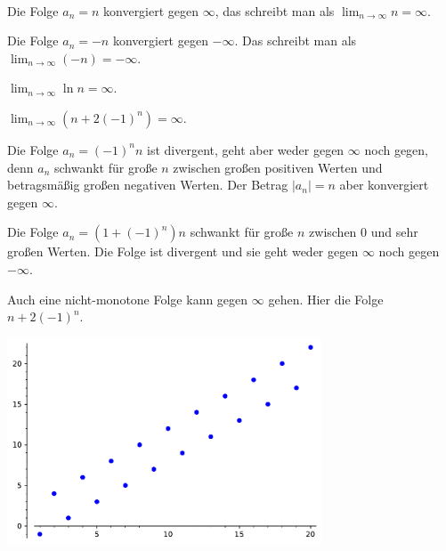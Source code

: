 \begin{bsp} {\ } 
	\begin{enuma}
		\item Die Folge $a_n = n$ konvergiert gegen $\infty$, das schreibt man als $\lim_{n \to \infty} n = \infty$. 
		\item  Die Folge $a_n = -n$ konvergiert gegen $-\infty$. Das schreibt man als $\lim_{n \to \infty} (-n) = -\infty$. 
		\item $\lim_{n \to \infty} \ln n = \infty$. 
		\item $\lim_{n \to \infty} (n + 2 (-1)^n) = \infty$. 
		\item Die Folge $a_n = (-1)^n n$ ist divergent, geht aber weder gegen $\infty$ noch gegen, denn $a_n$ schwankt für große $n$ zwischen großen positiven Werten und betragsmäßig großen negativen Werten. Der Betrag $|a_n| = n$ aber konvergiert gegen $\infty$. 
		\item Die Folge $a_n = ( 1 + (-1)^n) n$ schwankt für große $n$ zwischen $0$ und sehr großen Werten. Die Folge ist divergent und sie geht weder gegen $\infty$ noch gegen $-\infty$. 
	\end{enuma}
\end{bsp} 

\begin{bem}
	Auch eine nicht-monotone Folge kann gegen $\infty$ gehen. 
Hier die Folge $n+ 2 (-1)^n$.
	\begin{center}
			\includegraphics[width=0.7\textwidth]{code/gegen_unendlich.pdf}
	\end{center} 
\end{bem} 



